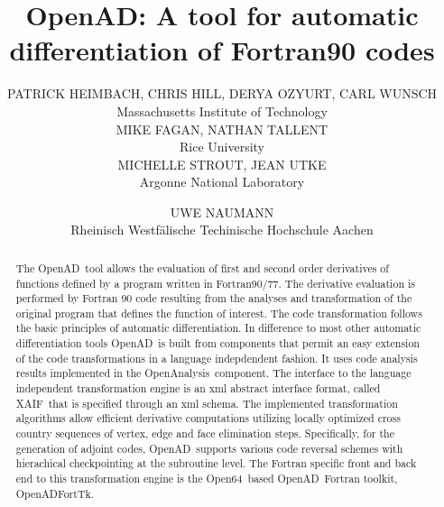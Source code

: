 \documentclass[11pt]{article}
\newcommand{\OpenAD}{OpenAD}
\newcommand{\OpenADFortTk}{OpenADFortTk}
\newcommand{\OpenAnalysis}{OpenAnalysis}
\newcommand{\OpenSixtyFour}{Open64}
\newcommand{\xaif}{XAIF}
\begin{document}
\title{OpenAD: A tool for automatic differentiation of Fortran90 codes}

\author{PATRICK HEIMBACH, CHRIS HILL, DERYA OZYURT, CARL WUNSCH\\Massachusetts Institute of Technology\\
MIKE FAGAN, NATHAN TALLENT \\Rice University\\
MICHELLE STROUT, JEAN UTKE \\Argonne National Laboratory 
\and
UWE NAUMANN\\Rheinisch Westf\"alische Techinische Hochschule Aachen}

\begin{abstract}

The \OpenAD\ tool allows the evaluation of first and second order
derivatives of functions defined by a program written in Fortran90/77.
The derivative evaluation is performed by Fortran 90 code resulting
from the analyses and transformation of the original program that
defines the function of interest.  The code transformation follows the
basic principles of automatic differentiation.  In difference to most
other automatic differentiation tools \OpenAD\ is built from
components that permit an easy extension of the code transformations
in a language indepdendent fashion. It uses code analysis results
implemented in the \OpenAnalysis\ component.  The interface to the
language independent transformation engine is an xml abstract
interface format, called \xaif\ that is specified through an xml
schema.  The implemented transformation algorithms allow efficient
derivative computations utilizing locally optimized cross country
sequences of vertex, edge and face elimination steps.  Specifically,
for the generation of adjoint codes, \OpenAD\ supports various code
reversal schemes with hierachical checkpointing at the subroutine
level.  The Fortran specific front and back end to this transformation
engine is the \OpenSixtyFour\ based \OpenAD\ Fortran toolkit,
\OpenADFortTk.

\end{abstract}




\end{document}
